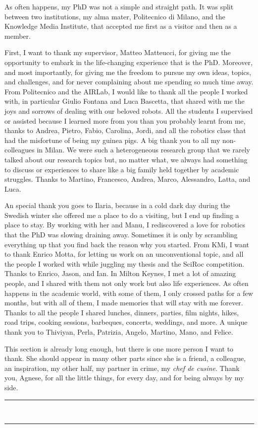 As often happens, my PhD was not a simple and straight path. It was split between two institutions, my alma mater, Politecnico di Milano, and the Knowledge Media Institute, that accepted me first as a visitor and then as a member.

First, I want to thank my supervisor, Matteo Matteucci, for giving me the opportunity to embark in the life-changing experience that is the PhD. Moreover, and most importantly, for giving me the freedom to pursue my own ideas, topics, and challenges, and for never complaining about me spending so much time away. From Politecnico and the AIRLab, I would like to thank all the people I worked with, in particular Giulio Fontana and Luca Bascetta, that shared with me the joys and sorrows of dealing with our beloved robots. All the students I supervised or assisted because I learned more from you than you probably learnt from me, thanks to Andrea, Pietro, Fabio, Carolina, Jordi, and all the robotics class that had the misfortune of being my guinea pigs. A big thank you to all my non-colleagues in Milan. We were such a heterogeneous research group that we rarely talked about our research topics but, no matter what, we always had something to discuss or experiences to share like a big family held together by academic struggles. Thanks to Martino, Francesco, Andrea, Marco, Alessandro, Latta, and Luca.

An special thank you goes to Ilaria, because in a cold dark day during the Swedish winter she offered me a place to do a visiting, but I end up finding a place to stay. By working with her and Manu, I rediscovered a love for robotics that the PhD was slowing draining away. Sometimes it is only by scrambling everything up that you find back the reason why you started. From KMi, I want to thank Enrico Motta, for letting us work on an unconventional topic, and all the people I worked with while juggling my thesis and the SciRoc competition. Thanks to Enrico, Jason, and Ian. In Milton Keynes, I met a lot of amazing people, and I shared with them not only work but also life experiences. As often happens in the academic world, with some of them, I only crossed paths for a few months, but with all of them, I made memories that will stay with me forever. Thanks to all the people I shared lunches, dinners, parties, film nights, hikes, road trips, cooking sessions, barbeques, concerts, weddings, and more. A unique thank you to Thiviyan, Perla, Patrizia, Angelo, Martino, Mano, and Felice.

This section is already long enough, but there is one more person I want to thank. She should appear in many other parts since she is a friend, a colleague, an inspiration, my other half, my partner in crime, my \textit{chef de cusine}. Thank you, Agnese, for all the little things, for every day, and for being always by my side.

\vspace{1cm}

\begin{center}
\rule[1mm]{1cm}{0.4pt}~{\large \textit{}}~\rule[1mm]{1cm}{0.4pt}
\end{center}
\endgroup
